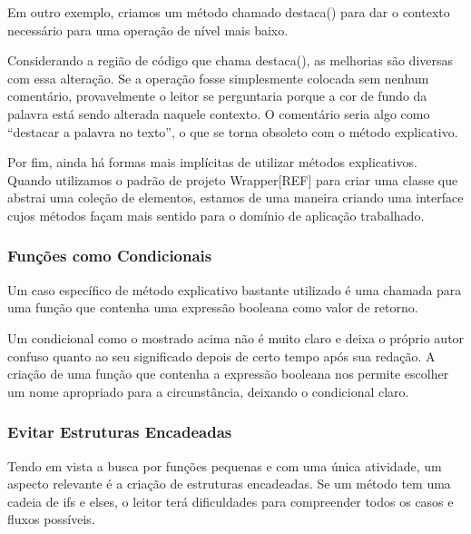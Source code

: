 Em outro exemplo, criamos um método chamado destaca() para dar o contexto necessário para uma operação de nível mais baixo. 



Considerando a região de código que chama destaca(), as melhorias são diversas com essa alteração. Se a operação fosse simplesmente colocada sem nenhum comentário, provavelmente o leitor se perguntaria porque a cor de fundo da palavra está sendo alterada naquele contexto. O comentário seria algo como “destacar a palavra no texto”, o que se torna obsoleto com o método explicativo. 

Por fim, ainda há formas mais implícitas de utilizar métodos explicativos. Quando utilizamos o padrão de projeto Wrapper[REF] para criar uma classe que abstrai uma coleção de elementos, estamos de uma maneira criando uma interface cujos métodos façam mais sentido para o domínio de aplicação trabalhado.

\subsubsection{Funções como Condicionais}
Um caso específico de método explicativo bastante utilizado é uma chamada para uma função que contenha uma expressão booleana como valor de retorno.
	


Um condicional como o mostrado acima não é muito claro e deixa o próprio autor confuso quanto ao seu significado depois de certo tempo após sua redação. A criação de uma função que contenha a expressão booleana nos permite escolher um nome apropriado para a circunstância, deixando o condicional claro.



\subsubsection{Evitar Estruturas Encadeadas}
Tendo em vista a busca por funções pequenas e com uma única atividade, um aspecto relevante é a criação de estruturas encadeadas. Se um método tem uma cadeia de ifs e elses, o leitor terá dificuldades para compreender todos os casos e fluxos possíveis.
	
